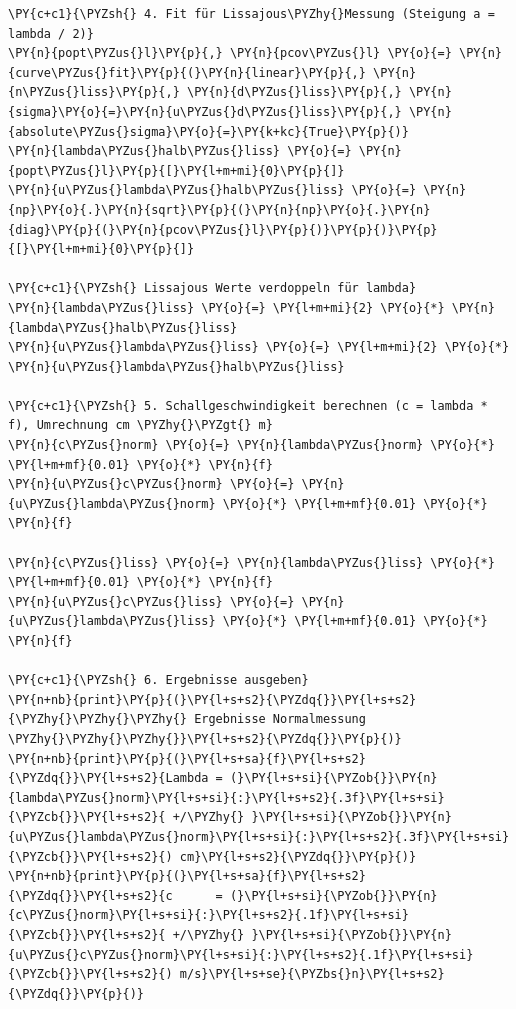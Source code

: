 \begin{tcolorbox}[breakable, size=fbox, boxrule=1pt, pad at break*=1mm,colback=cellbackground, colframe=cellborder]
\begin{Verbatim}[commandchars=\\\{\}]
\PY{c+c1}{\PYZsh{} 4. Fit für Lissajous\PYZhy{}Messung (Steigung a = lambda / 2)}
\PY{n}{popt\PYZus{}l}\PY{p}{,} \PY{n}{pcov\PYZus{}l} \PY{o}{=} \PY{n}{curve\PYZus{}fit}\PY{p}{(}\PY{n}{linear}\PY{p}{,} \PY{n}{n\PYZus{}liss}\PY{p}{,} \PY{n}{d\PYZus{}liss}\PY{p}{,} \PY{n}{sigma}\PY{o}{=}\PY{n}{u\PYZus{}d\PYZus{}liss}\PY{p}{,} \PY{n}{absolute\PYZus{}sigma}\PY{o}{=}\PY{k+kc}{True}\PY{p}{)}
\PY{n}{lambda\PYZus{}halb\PYZus{}liss} \PY{o}{=} \PY{n}{popt\PYZus{}l}\PY{p}{[}\PY{l+m+mi}{0}\PY{p}{]}
\PY{n}{u\PYZus{}lambda\PYZus{}halb\PYZus{}liss} \PY{o}{=} \PY{n}{np}\PY{o}{.}\PY{n}{sqrt}\PY{p}{(}\PY{n}{np}\PY{o}{.}\PY{n}{diag}\PY{p}{(}\PY{n}{pcov\PYZus{}l}\PY{p}{)}\PY{p}{)}\PY{p}{[}\PY{l+m+mi}{0}\PY{p}{]}

\PY{c+c1}{\PYZsh{} Lissajous Werte verdoppeln für lambda}
\PY{n}{lambda\PYZus{}liss} \PY{o}{=} \PY{l+m+mi}{2} \PY{o}{*} \PY{n}{lambda\PYZus{}halb\PYZus{}liss}
\PY{n}{u\PYZus{}lambda\PYZus{}liss} \PY{o}{=} \PY{l+m+mi}{2} \PY{o}{*} \PY{n}{u\PYZus{}lambda\PYZus{}halb\PYZus{}liss}

\PY{c+c1}{\PYZsh{} 5. Schallgeschwindigkeit berechnen (c = lambda * f), Umrechnung cm \PYZhy{}\PYZgt{} m}
\PY{n}{c\PYZus{}norm} \PY{o}{=} \PY{n}{lambda\PYZus{}norm} \PY{o}{*} \PY{l+m+mf}{0.01} \PY{o}{*} \PY{n}{f}
\PY{n}{u\PYZus{}c\PYZus{}norm} \PY{o}{=} \PY{n}{u\PYZus{}lambda\PYZus{}norm} \PY{o}{*} \PY{l+m+mf}{0.01} \PY{o}{*} \PY{n}{f}

\PY{n}{c\PYZus{}liss} \PY{o}{=} \PY{n}{lambda\PYZus{}liss} \PY{o}{*} \PY{l+m+mf}{0.01} \PY{o}{*} \PY{n}{f}
\PY{n}{u\PYZus{}c\PYZus{}liss} \PY{o}{=} \PY{n}{u\PYZus{}lambda\PYZus{}liss} \PY{o}{*} \PY{l+m+mf}{0.01} \PY{o}{*} \PY{n}{f}

\PY{c+c1}{\PYZsh{} 6. Ergebnisse ausgeben}
\PY{n+nb}{print}\PY{p}{(}\PY{l+s+s2}{\PYZdq{}}\PY{l+s+s2}{\PYZhy{}\PYZhy{}\PYZhy{} Ergebnisse Normalmessung \PYZhy{}\PYZhy{}\PYZhy{}}\PY{l+s+s2}{\PYZdq{}}\PY{p}{)}
\PY{n+nb}{print}\PY{p}{(}\PY{l+s+sa}{f}\PY{l+s+s2}{\PYZdq{}}\PY{l+s+s2}{Lambda = (}\PY{l+s+si}{\PYZob{}}\PY{n}{lambda\PYZus{}norm}\PY{l+s+si}{:}\PY{l+s+s2}{.3f}\PY{l+s+si}{\PYZcb{}}\PY{l+s+s2}{ +/\PYZhy{} }\PY{l+s+si}{\PYZob{}}\PY{n}{u\PYZus{}lambda\PYZus{}norm}\PY{l+s+si}{:}\PY{l+s+s2}{.3f}\PY{l+s+si}{\PYZcb{}}\PY{l+s+s2}{) cm}\PY{l+s+s2}{\PYZdq{}}\PY{p}{)}
\PY{n+nb}{print}\PY{p}{(}\PY{l+s+sa}{f}\PY{l+s+s2}{\PYZdq{}}\PY{l+s+s2}{c      = (}\PY{l+s+si}{\PYZob{}}\PY{n}{c\PYZus{}norm}\PY{l+s+si}{:}\PY{l+s+s2}{.1f}\PY{l+s+si}{\PYZcb{}}\PY{l+s+s2}{ +/\PYZhy{} }\PY{l+s+si}{\PYZob{}}\PY{n}{u\PYZus{}c\PYZus{}norm}\PY{l+s+si}{:}\PY{l+s+s2}{.1f}\PY{l+s+si}{\PYZcb{}}\PY{l+s+s2}{) m/s}\PY{l+s+se}{\PYZbs{}n}\PY{l+s+s2}{\PYZdq{}}\PY{p}{)}


\end{Verbatim}
\end{tcolorbox}

